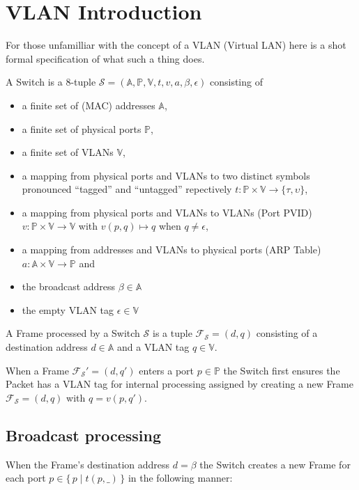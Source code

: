\documentclass{article}
\begin{document}
\section{VLAN Introduction}

For those unfamilliar with the concept of a VLAN (Virtual LAN) here is a shot
formal specification of what such a thing does.

A Switch is a 8-tuple \( \mathcal{S} = (\mathbb{A}, \mathbb{P}, \mathbb{V}, t, v, a, \beta, \epsilon) \)
consisting of
\begin{itemize}
\item a finite set of (MAC) addresses \(\mathbb{A}\),
\item a finite set of physical ports \(\mathbb{P}\),
\item a finite set of VLANs \(\mathbb{V}\),
\item a mapping from physical ports and VLANs to two distinct symbols pronounced
  ``tagged'' and ``untagged'' repectively
  \( t : \mathbb{P} \times \mathbb{V} \rightarrow \{ \tau, \upsilon \} \),
\item a mapping from physical ports and VLANs to VLANs (Port PVID)
  \( v : \mathbb{P} \times \mathbb{V} \rightarrow \mathbb{V} \)
  with \(v(p, q) \mapsto q\) when \(q \neq \epsilon\),
\item a mapping from addresses and VLANs to physical ports (ARP Table)
  \( a : \mathbb{A} \times \mathbb{V} \rightarrow \mathbb{P} \) and
\item the broadcast address \(\beta \in \mathbb{A}\)
\item the empty VLAN tag \(\epsilon \in \mathbb{V}\)
\end{itemize}

A Frame processed by a Switch \(\mathcal{S}\)
is a tuple \( \mathcal{F}_\mathcal{S} = (d, q) \)
consisting of a destination address \(d \in \mathbb{A} \) and a VLAN tag \( q \in \mathbb{V} \).

When a Frame \( \mathcal{F}_\mathcal{S}' = (d, q') \)
enters a port \( p \in \mathbb{P}\)
the Switch first ensures the Packet has a VLAN tag for internal processing
assigned by creating a new Frame \( \mathcal{F}_\mathcal{S} = (d, q)\) with \(q = v(p, q')\).

\subsection{Broadcast processing}

When the Frame's destination address \( d = \beta \)
the Switch creates a new Frame for each port
\( p \in \{\, p \mid t(p, \_) \,\} \)
in the following manner:
\end{document}
